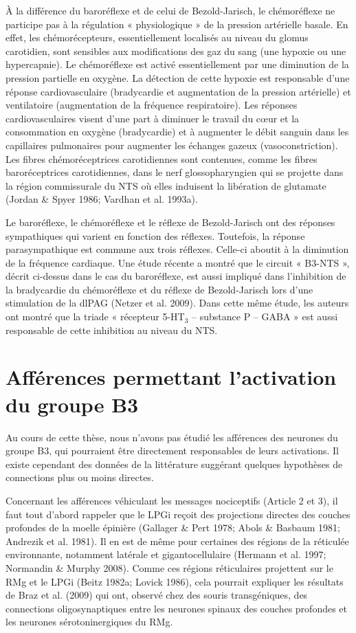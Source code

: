 \documentclass[a4paper,12pt,twoside]{report}
\begin{document}
\`A la différence du baroréflexe et de celui de Bezold-Jarisch, le chémoréflexe ne participe pas à la régulation « physiologique » de la pression artérielle basale. En effet, les chémorécepteurs, essentiellement localisés au niveau du glomus carotidien, sont sensibles aux modifications des gaz du sang (une hypoxie ou une hypercapnie). Le chémoréflexe est activé essentiellement par une diminution de la pression partielle en oxygène. La détection de cette hypoxie est responsable d’une réponse cardiovasculaire (bradycardie et augmentation de la pression artérielle) et ventilatoire (augmentation de la fréquence respiratoire). Les réponses cardiovasculaires visent d’une part à diminuer le travail du cœur et la consommation en oxygène (bradycardie) et à augmenter le débit sanguin dans les capillaires pulmonaires pour augmenter les échanges gazeux (vasoconstriction). Les fibres chémoréceptrices carotidiennes sont contenues, comme les fibres baroréceptrices carotidiennes, dans le nerf glossopharyngien qui se projette dans la région commissurale du NTS où elles induisent la libération de glutamate (Jordan \& Spyer 1986; Vardhan et al. 1993a). 

Le baroréflexe, le chémoréflexe et le réflexe de Bezold-Jarisch ont des réponses sympathiques qui varient en fonction des réflexes. Toutefois, la réponse parasympathique est commune aux trois réflexes. Celle-ci aboutit à la diminution de la fréquence cardiaque. Une étude récente a montré que le circuit « B3-NTS », décrit ci-dessus dans le cas du baroréflexe, est aussi impliqué dans l’inhibition de la bradycardie du chémoréflexe et du réflexe de Bezold-Jarisch lors d’une stimulation de la dlPAG (Netzer et al. 2009). Dans cette même étude, les auteurs ont montré que la triade « récepteur 5-HT$_{3}$ – substance P – GABA » est aussi responsable de cette inhibition au niveau du NTS.

\section{Afférences permettant l’activation du groupe B3}

Au cours de cette thèse, nous n’avons pas étudié les afférences des neurones du groupe B3, qui pourraient être directement responsables de leurs activations. Il existe cependant des données de la littérature suggérant quelques hypothèses de connections plus ou moins directes.

Concernant les afférences véhiculant les messages nociceptifs (Article 2 et 3), il faut tout d’abord rappeler que le LPGi reçoit des projections directes des couches profondes de la moelle épinière (Gallager \& Pert 1978; Abols \& Basbaum 1981; Andrezik et al. 1981). Il en est de même pour certaines des régions de la réticulée environnante, notamment latérale et gigantocellulaire (Hermann et al. 1997; Normandin \& Murphy 2008). Comme ces régions réticulaires projettent sur le RMg et le LPGi (Beitz 1982a; Lovick 1986), cela pourrait expliquer les résultats de Braz et al. (2009) qui ont, observé chez des souris transgéniques, des connections oligosynaptiques entre les neurones spinaux des couches profondes et les neurones sérotoninergiques du RMg.
\end{document}

